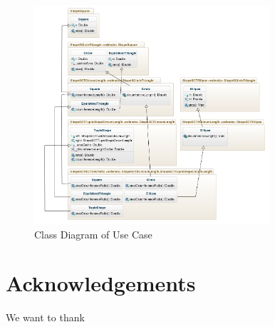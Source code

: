 \documentclass{report}
\begin{document}
\begin{figure}[h]
\includegraphics[width=330px,keepaspectratio=true]{Expression_problem-diag2.jpg}
\caption{Class Diagram of Use Case}
\end{figure}


\chapter*{Acknowledgements}
We want to thank 
\begingroup
\renewcommand{\cleardoublepage}{}
\renewcommand{\clearpage}{}




\endgroup
\end{document}
